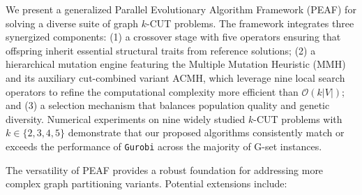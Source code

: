 \documentclass[12pt, a4paper]{article}%
\numberwithin{equation}{section}
\theoremstyle{plain}
\begin{document}
			
	
			
			
			We present a generalized Parallel Evolutionary Algorithm Framework (PEAF) for solving a diverse suite of graph $k$-CUT problems. The framework integrates three synergized components: (1) a crossover stage with five operators ensuring that offspring inherit essential structural traits from reference solutions; (2) a hierarchical mutation engine featuring the Multiple Mutation Heuristic (MMH) and its auxiliary cut-combined variant ACMH, which leverage nine local search operators to refine the computational complexity more efficient than $\mathcal{O}(k|V|)$; and (3) a selection mechanism that balances population quality and genetic diversity. Numerical experiments on nine widely studied $k$-CUT problems with $k \in \{2, 3, 4, 5\}$ demonstrate that our proposed algorithms consistently match or exceeds the performance of \texttt{Gurobi} across the majority of G-set instances. 
			
			The versatility of PEAF provides a robust foundation for addressing more complex graph partitioning variants. Potential extensions include:
			
\end{document}
